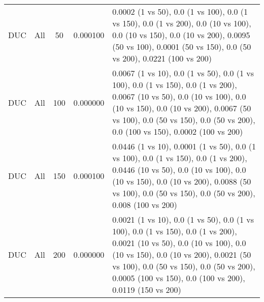 \begin{tabular}{|l|c|c|c|p{7cm}|}
DUC & All & 50 & 0.000100 & 0.0002 (1 vs 50), 0.0 (1 vs 100), 0.0 (1 vs 150), 0.0 (1 vs 200), 0.0 (10 vs 100), 0.0 (10 vs 150), 0.0 (10 vs 200), 0.0095 (50 vs 100), 0.0001 (50 vs 150), 0.0 (50 vs 200), 0.0221 (100 vs 200) \\
DUC & All & 100 & 0.000000 & 0.0067 (1 vs 10), 0.0 (1 vs 50), 0.0 (1 vs 100), 0.0 (1 vs 150), 0.0 (1 vs 200), 0.0067 (10 vs 50), 0.0 (10 vs 100), 0.0 (10 vs 150), 0.0 (10 vs 200), 0.0067 (50 vs 100), 0.0 (50 vs 150), 0.0 (50 vs 200), 0.0 (100 vs 150), 0.0002 (100 vs 200) \\
DUC & All & 150 & 0.000100 & 0.0446 (1 vs 10), 0.0001 (1 vs 50), 0.0 (1 vs 100), 0.0 (1 vs 150), 0.0 (1 vs 200), 0.0446 (10 vs 50), 0.0 (10 vs 100), 0.0 (10 vs 150), 0.0 (10 vs 200), 0.0088 (50 vs 100), 0.0 (50 vs 150), 0.0 (50 vs 200), 0.008 (100 vs 200) \\
DUC & All & 200 & 0.000000 & 0.0021 (1 vs 10), 0.0 (1 vs 50), 0.0 (1 vs 100), 0.0 (1 vs 150), 0.0 (1 vs 200), 0.0021 (10 vs 50), 0.0 (10 vs 100), 0.0 (10 vs 150), 0.0 (10 vs 200), 0.0021 (50 vs 100), 0.0 (50 vs 150), 0.0 (50 vs 200), 0.0005 (100 vs 150), 0.0 (100 vs 200), 0.0119 (150 vs 200) \\
\bottomrule
\end{tabular}
